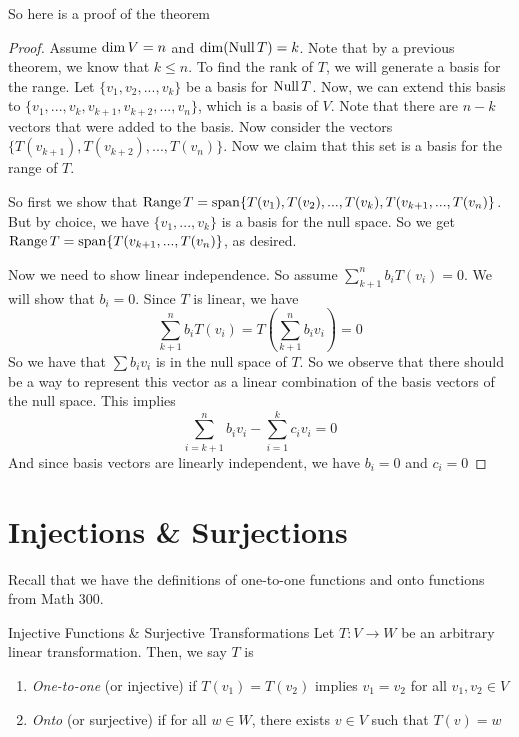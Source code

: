\documentclass[main.tex]{subfiles}
\begin{document}
    So here is a proof of the theorem 
    \begin{proof}
        Assume $\operatorname{dim} V = n$ and $\operatorname{dim} (\operatorname{Null} T) = k$. Note that by a previous theorem, we know that $k\leq n$. To find the rank of $T$, we will generate a basis for the range. Let $\{v_1, v_2, ..., v_k\}$ be a basis for $\operatorname{Null} T$. Now, we can extend this basis to $\{v_1, ..., v_k, v_{k+1}, v_{k+2}, ..., v_n\}$, which is a basis of $V$. Note that there are $n-k$ vectors that were added to the basis. Now consider the vectors $\{T(v_{k+1}), T(v_{k+2}), ..., T(v_n)\}$. Now we claim that this set is a basis for the range of $T$. \par 

        So first we show that $\operatorname{Range} T = \operatorname{span} \{T(v_1), T(v_2), ..., T(v_k), T(v_{k+1}, ..., T(v_n)\}$. But by choice, we have $\{v_1, ..., v_k\}$ is a basis for the null space. So we get $\operatorname{Range} T = \operatorname{span} \{T(v_{k+1}, ..., T(v_n)\}$, as desired. \par 

        Now we need to show linear independence. So assume $\sum_{k+1}^n b_iT(v_i) = 0$. We will show that $b_i = 0$. Since $T$ is linear, we have 
        \begin{equation}
            \sum_{k+1}^n b_i T(v_i) = T \left( \sum_{k+1}^n b_i v_i \right) = 0
        \end{equation}
        So we have that $\sum b_iv_i$ is in the null space of $T$. So we observe that there should be a way to represent this vector as a linear combination of the basis vectors of the null space. This implies 
        \begin{equation}
            \sum_{i=k+1}^n b_iv_i - \sum_{i=1}^k c_iv_i=0
        \end{equation}
        And since basis vectors are linearly independent, we have $b_i = 0$ and $c_i = 0$
    \end{proof}

    \section{Injections \& Surjections}
    Recall that we have the definitions of one-to-one functions and onto functions from Math 300. 
    \begin{defn}{Injective Functions \& Surjective Transformations}
        Let $T: V\to W$ be an arbitrary linear transformation. Then, we say $T$ is 
        \begin{enumerate}
            \item \textit{One-to-one} (or injective) if $T(v_1) = T(v_2)$ implies $v_1 = v_2$ for all $v_1, v_2 \in V$

            \item \textit{Onto} (or surjective) if for all $w\in W$, there exists $v\in V$ such that $T(v) = w$
        \end{enumerate}
    \end{defn}
\end{document}
